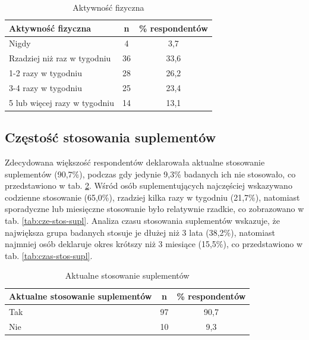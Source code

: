 
\begin{table}[H]
    \centering
    \caption{Aktywność fizyczna}
    \label{tab:aktywnosc fizyczna}
    \begin{tabular}{|l|c|c|}
        \hline
        \textbf{Aktywność fizyczna} & \textbf{n} & \textbf{\% respondentów} \\
        \hline
        \hline
        Nigdy & 4 & 3,7 \\
        \hline
        Rzadziej niż raz w tygodniu & 36 & 33,6 \\
        \hline
        1-2 razy w tygodniu	& 28 & 26,2 \\
        \hline
        3-4 razy w tygodniu & 25 & 23,4 \\
        \hline
        5 lub więcej razy w tygodniu & 14 & 13,1 \\
        \hline
    \end{tabular}
\end{table}



\subsection{Częstość stosowania suplementów}

Zdecydowana większość respondentów deklarowała aktualne stosowanie suplementów (90,7\%), podczas gdy jedynie 9,3\% badanych ich nie stosowało, co przedstawiono w tab. \ref{tab:akt-stos-supl}. Wśród osób suplementujących najczęściej wskazywano codzienne stosowanie (65,0\%), rzadziej kilka razy w tygodniu (21,7\%), natomiast sporadyczne lub miesięczne stosowanie było relatywnie rzadkie, co zobrazowano w tab. \ref{tab:cze-stos-supl}. Analiza czasu stosowania suplementów wskazuje, że największa grupa badanych stosuje je dłużej niż 3 lata (38,2\%), natomiast najmniej osób deklaruje okres krótszy niż 3 miesiące (15,5\%), co przedstawiono w tab. \ref{tab:czas-stos-supl}.


\begin{table}[H]
    \centering
    \caption{Aktualne stosowanie suplementów}
    \label{tab:akt-stos-supl}
    \begin{tabular}{|l|c|c|}
        \hline
        \textbf{Aktualne stosowanie suplementów} & \textbf{n} & \textbf{\% respondentów} \\
        \hline
        \hline
        Tak & 97 & 90,7 \\
        \hline
        Nie & 10 & 9,3 \\
        \hline
    \end{tabular}
\end{table}

